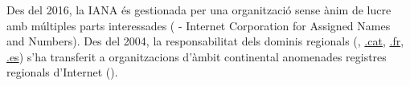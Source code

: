 \begin{remark}
Des del 2016, la IANA és gestionada per una organització sense ànim de lucre amb múltiples parts interessades 
( - Internet Corporation for Assigned Names and Numbers).
% 
Des del 2004, la responsabilitat dels dominis regionals 
(\eg, \url{.cat}, \url{.fr}, \url{.es}) s'ha transferit a organitzacions 
d'àmbit continental anomenades registres regionals d'Internet ().
\end{remark}









